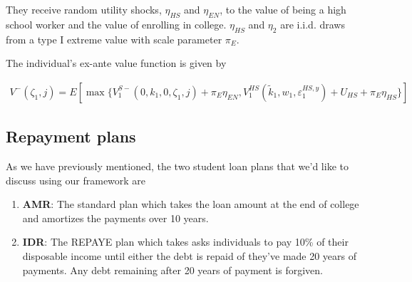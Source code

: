   They receive random utility shocks, $\eta_{HS}$ and $\eta_{EN}$, to the value of being a high
  school worker and the value of enrolling in college. $\eta_{HS}$ and $\eta_2$ are i.i.d. draws
  from a type I extreme value with scale parameter $\pi_E$.

  The individual's ex-ante value function is given by

  \begin{align*}
    V^{-}(\zeta_1, j) = E \left[ \max \{
      V_1^{S-}(0, k_1, 0, \zeta_1, j) + \pi_E \eta_{EN},
      V_1^{HS}(\tilde{k}_1, w_1, \varepsilon^{HS, y}_1) + U_{HS} + \pi_E \eta_{HS}
    \} \right]
  \end{align*}


%
%
%
%
%


\subsection{Repayment plans}

  As we have previously mentioned, the two student loan plans that we'd like to discuss using our
  framework are

  \begin{enumerate}
    \item \textbf{AMR}: The standard plan which takes the loan amount at the end of college and
    amortizes the payments over 10 years.
    \item \textbf{IDR}: The REPAYE plan which takes asks individuals to pay 10\% of their disposable
    income until either the debt is repaid of they've made 20 years of payments. Any debt remaining
    after 20 years of payment is forgiven.
  \end{enumerate}

